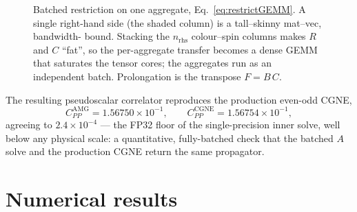 \documentclass[12pt,a4paper]{article}
\newcommand{\Aop}{A}
\newcommand{\dg}{^{\dagger}}
\begin{document}
\begin{figure}[h]
\centering
{}
\caption{Batched restriction on one aggregate, Eq.~\eqref{eq:restrictGEMM}. A
single right-hand side (the shaded column) is a tall--skinny mat--vec, bandwidth-
bound. Stacking the $n_{\mathrm{rhs}}$ colour--spin columns makes $R$ and $C$
``fat'', so the per-aggregate transfer becomes a dense GEMM that saturates the
tensor cores; the aggregates run as an independent batch. Prolongation is the
transpose $F=B\,C$.}
\label{fig:gemm}
\end{figure}

The resulting pseudoscalar correlator reproduces the production even-odd CGNE,
\[
  C_{PP}^{\mathrm{AMG}} = 1.56750\times10^{-1}, \qquad
  C_{PP}^{\mathrm{CGNE}} = 1.56754\times10^{-1},
\]
agreeing to $2.4\times10^{-4}$ --- the FP32 floor of the single-precision inner
solve, well below any physical scale: a quantitative, fully-batched check that
the batched $\Aop$ solve and the production CGNE return the same propagator.


\section{Numerical results}
\label{sec:results}
\end{document}
